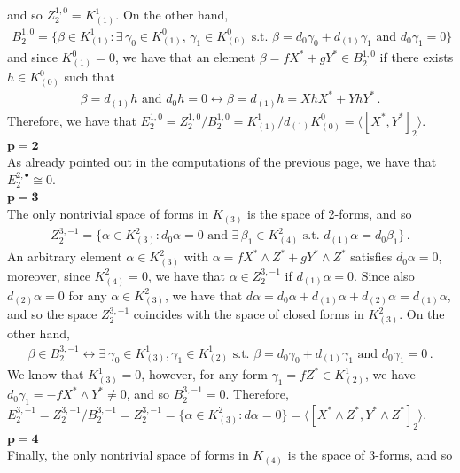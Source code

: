 \documentclass[10pt]{amsart}
\theoremstyle{remark}
\numberwithin{equation}{section}
\begin{document}
and so $Z_2^{1,0}=K^1_{(1)}$.
On the other hand, 
\begin{align*}
    B_2^{1,0}=\lbrace \beta\in K_{(1)}^1: \exists \,\gamma_0\in K_{(1)}^0,\,\gamma_1\in K_{(0)}^0\text{ s.t. }\beta=d_0\gamma_0+d_{(1)}\gamma_1\text{ and }d_0\gamma_1=0\rbrace
\end{align*}
and since $K_{(1)}^0=0$, we have that an element $\beta=fX^\ast+gY^\ast\in B_2^{1,0}$ if there exists $h\in K_{(0)}^0$ such that 
\begin{align*}
    \beta=d_{(1)}h\text{ and }d_0h=0 \longleftrightarrow \beta= d_{(1)}h=Xh X^\ast+Yh Y^\ast\,.
\end{align*}
Therefore, we have that $E_2^{1,0}=Z_2^{1,0}/B^{1,0}_2=K_{(1)}^1/d_{(1)}K_{(0)}^0=\langle [X^\ast,Y^\ast]_2\rangle$.\\
$\mathbf{p=2}$\\
As already pointed out in the computations of the previous page, we have that $E_2^{2,\bullet}\cong 0$.\\
$\mathbf{p=3}$\\
The only nontrivial space of forms in $K_{(3)}$ is the space of 2-forms, and so
\begin{align*}
    Z_2^{3,-1}=\lbrace \alpha\in K_{(3)}^2: d_0\alpha=0\text{ and }\exists\,\beta_1\in K_{(4)}^2\text{ s.t. } d_{(1)}\alpha=d_0\beta_1\rbrace\,.
\end{align*}
An arbitrary element $\alpha\in K_{(3)}^2$ with $\alpha=fX^\ast\wedge Z^\ast+gY^\ast\wedge Z^\ast$ satisfies $d_0\alpha=0$, moreover, since $K_{(4)}^2=0$, we have that $\alpha\in Z_2^{3,-1}$ if $d_{(1)}\alpha=0$. Since also $d_{(2)}\alpha=0$ for any $\alpha\in K_{(3)}^2$, we have that $d\alpha=d_0\alpha+d_{(1)}\alpha+d_{(2)}\alpha=d_{(1)}\alpha$, and so the space $Z_2^{3,-1}$ coincides with the space of closed forms in $K_{(3)}^2$.
On the other hand, 
\begin{align*}
    \beta\in B_2^{3,-1}\longleftrightarrow \exists\ \gamma_0\in K_{(3)}^1,\gamma_1\in K_{(2)}^1\text{ s.t. }\beta=d_0\gamma_0+d_{(1)}\gamma_1\text{ and }d_0\gamma_1=0\,.
\end{align*}
We know that $K_{(3)}^1=0$, however, for any form $\gamma_1=f Z^\ast\in K_{(2)}^1$, we have $d_0\gamma_1=-fX^\ast\wedge Y^\ast\neq 0$, and so $B_2^{3,-1}=0$. Therefore, $E_2^{3,-1}=Z_2^{3,-1}/B_2^{3,-1}=Z_2^{3,-1}=\lbrace \alpha\in K_{(3)}^2:d\alpha=0\rbrace=\langle [X^\ast\wedge Z^\ast,Y^\ast\wedge Z^\ast]_2\rangle$.\\
$\mathbf{p=4}$\\
Finally, the only nontrivial space of forms in $K_{(4)}$ is the space of 3-forms, and so
\end{document}
